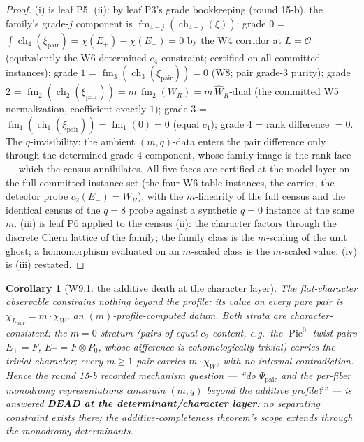 \documentclass[11pt]{article}
\newtheorem{corollary}[lemma]{Corollary}
\newcommand{\WR}{W_R}
\newcommand{\ch}{\operatorname{ch}}
\newcommand{\Pic}{\operatorname{Pic}}
\newcommand{\fm}{\operatorname{fm}}
\begin{document}
\begin{proof}
(i) is leaf P5. (ii): by leaf P3's grade bookkeeping (round 15-b), the
family's grade-$j$ component is $\fm_{4-j}(\ch_{4-j}(\xi))$: grade $0$ =
$\int\ch_4(\xi_{\mathrm{pair}}) = \chi(E_+) - \chi(E_-) = 0$ by the W4
corridor at $L = \mathcal{O}$ (equivalently the W6-determined $c_4$
constraint; certified on all committed instances); grade $1$ =
$\fm_3(\ch_3(\xi_{\mathrm{pair}})) = 0$ (W8; pair grade-3 purity);
grade $2$ = $\fm_2(\ch_2(\xi_{\mathrm{pair}})) = m\,\fm_2(\WR) =
m\,\widehat\WR$-dual (the committed W5 normalization, coefficient exactly
$1$); grade $3$ = $\fm_1(\ch_1(\xi_{\mathrm{pair}})) = \fm_1(0) = 0$ (equal
$c_1$); grade $4$ = rank difference $= 0$. The $q$-invisibility: the ambient
$(m,q)$-data enters the pair difference only through the determined
grade-$4$ component, whose family image is the rank face --- which the
census annihilates. All five faces are certified at the model layer on the
full committed instance set (the four W6 table instances, the carrier, the
detector probe $c_2(E_-) = \WR$), with the $m$-linearity of the full census
and the identical census of the $q = 8$ probe against a synthetic $q = 0$
instance at the same $m$. (iii) is leaf P6 applied to the census (ii): the
character factors through the discrete Chern lattice of the family; the
family class is the $m$-scaling of the unit ghost; a homomorphism evaluated
on an $m$-scaled class is the $m$-scaled value. (iv) is (iii) restated.
\end{proof}

\begin{corollary}[W9.1: the additive death at the character layer]
\label{cor:W91}
The flat-character observable constrains nothing beyond the profile: its
value on every pure pair is $\chi_{L_{\mathrm{pair}}} = m\cdot\chi_W$, an
$(m)$-profile-computed datum. Both strata are character-consistent: the
$m = 0$ stratum (pairs of equal $c_2$-content, e.g.\ the $\Pic^0$-twist
pairs $E_\pm = F$, $E_\mp = F\otimes P_0$, whose difference is
cohomologically trivial) carries the trivial character; every $m \ge 1$ pair
carries $m\cdot\chi_W$, with no internal contradiction. Hence the round 15-b
recorded mechanism question --- ``do $\Psi_{\mathrm{pair}}$ and the
per-fiber monodromy representations constrain $(m,q)$ beyond the additive
profile?'' --- is answered \textbf{DEAD at the determinant/character layer}:
no separating constraint exists there; the additive-completeness theorem's
scope extends through the monodromy determinants.
\end{corollary}
\end{document}
